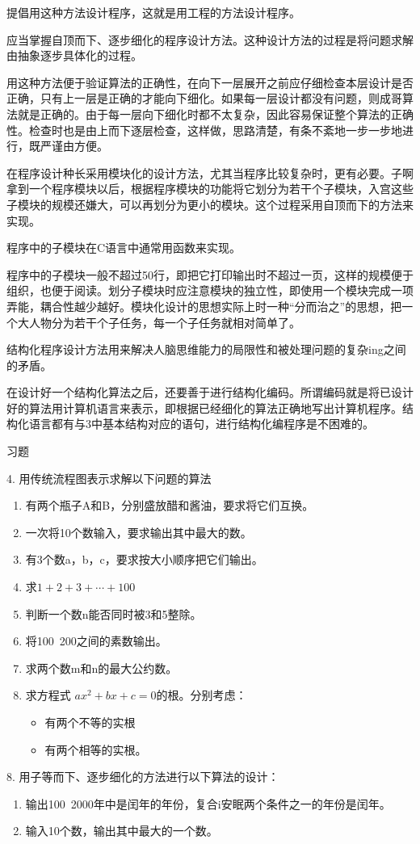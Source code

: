\begin{lslisting}
\begin{enumerate}
提倡用这种方法设计程序，这就是用工程的方法设计程序。

应当掌握自顶而下、逐步细化的程序设计方法。这种设计方法的过程是将问题求解由抽象逐步具体化的过程。

用这种方法便于验证算法的正确性，在向下一层展开之前应仔细检查本层设计是否正确，只有上一层是正确的才能向下细化。如果每一层设计都没有问题，则成哥算法就是正确的。由于每一层向下细化时都不太复杂，因此容易保证整个算法的正确性。检查时也是由上而下逐层检查，这样做，思路清楚，有条不紊地一步一步地进行，既严谨由方便。

在程序设计种长采用模块化的设计方法，尤其当程序比较复杂时，更有必要。子啊拿到一个程序模块以后，根据程序模块的功能将它划分为若干个子模块，入宫这些子模块的规模还嫌大，可以再划分为更小的模块。这个过程采用自顶而下的方法来实现。

程序中的子模块在C语言中通常用函数来实现。

程序中的子模块一般不超过50行，即把它打印输出时不超过一页，这样的规模便于组织，也便于阅读。划分子模块时应注意模块的独立性，即使用一个模块完成一项弄能，耦合性越少越好。模块化设计的思想实际上时一种“分而治之”的思想，把一个大人物分为若干个子任务，每一个子任务就相对简单了。

结构化程序设计方法用来解决人脑思维能力的局限性和被处理问题的复杂ing之间的矛盾。

在设计好一个结构化算法之后，还要善于进行结构化编码。所谓编码就是将已设计好的算法用计算机语言来表示，即根据已经细化的算法正确地写出计算机程序。结构化语言都有与3中基本结构对应的语句，进行结构化编程序是不困难的。

习题

4. 用传统流程图表示求解以下问题的算法
\begin{enumerate}
	\item 有两个瓶子A和B，分别盛放醋和酱油，要求将它们互换。
	\item 一次将10个数输入，要求输出其中最大的数。
	\item 有3个数a，b，c，要求按大小顺序把它们输出。
	\item 求$1 + 2 + 3 + \cdots + 100$
	\item 判断一个数n能否同时被3和5整除。
	\item 将100~200之间的素数输出。
	\item 求两个数m和n的最大公约数。
	\item 求方程式 $ax^2 + bx + c = 0$的根。分别考虑：
		\begin{itemize}
			\item 有两个不等的实根
			\item 有两个相等的实根。
		\end{itemize}
\end{enumerate}
8. 用子等而下、逐步细化的方法进行以下算法的设计：
\begin{enumerate}
	\item 输出100~2000年中是闰年的年份，复合i安眠两个条件之一的年份是闰年。
	\item 输入10个数，输出其中最大的一个数。
\end{enumerate}


\end{enumerate}
\end{lslisting}
